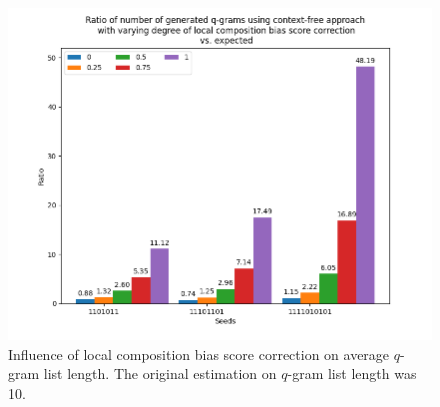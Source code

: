 \documentclass[twoside,a4paper,bsc]{master}
\newcommand{\Qgram}[1]{\(#1\)-gram}
\begin{document}
\begin{figure}
\centering
\includegraphics[scale=0.6]{graphics/comp_bias.png}
\caption{Influence of local composition bias score correction on average
\Qgram{q} list length. The original estimation on \Qgram{q} list length
was 10.}
\label{fig:compbias}
\end{figure}
\end{document}
